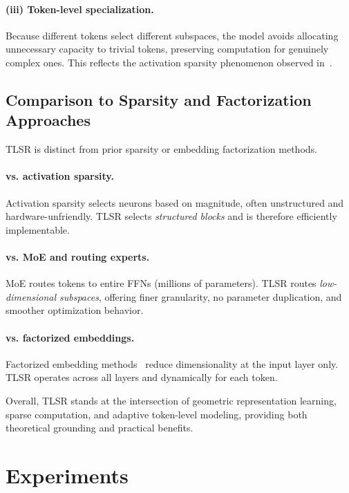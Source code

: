 \documentclass{article}
\theoremstyle{plain}
\theoremstyle{definition}
\theoremstyle{remark}
\begin{document}
\paragraph{(iii) Token-level specialization.}
Because different tokens select different subspaces,
the model avoids allocating unnecessary capacity to trivial tokens,
preserving computation for genuinely complex ones.
This reflects the activation sparsity phenomenon
observed in~\cite{li2023lazyneuron,liu2025teal}.

\subsection{Comparison to Sparsity and Factorization Approaches}

TLSR is distinct from prior sparsity or embedding factorization methods.

\paragraph{vs. activation sparsity.}
Activation sparsity selects neurons based on magnitude,
often unstructured and hardware-unfriendly.
TLSR selects \emph{structured blocks} and is therefore efficiently implementable.

\paragraph{vs. MoE and routing experts.}
MoE routes tokens to entire FFNs (millions of parameters).
TLSR routes \emph{low-dimensional subspaces}, offering finer granularity,
no parameter duplication, and smoother optimization behavior.

\paragraph{vs. factorized embeddings.}
Factorized embedding methods~\cite{baevski2019adaptiveinput,mehta2020define}
reduce dimensionality at the input layer only.
TLSR operates across all layers and dynamically for each token.

Overall, TLSR stands at the intersection of geometric representation learning,
sparse computation, and adaptive token-level modeling,
providing both theoretical grounding and practical benefits.


\section{Experiments}
\end{document}
